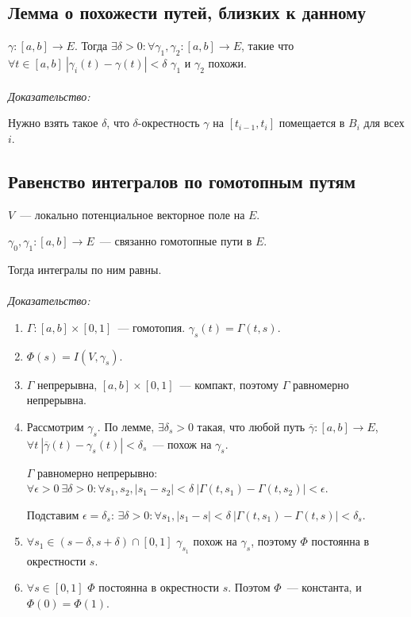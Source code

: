\documentclass[paper=a4, fontsize=11pt]{article}
\begin{document}
\subsection{Лемма о похожести путей, близких к данному}
$\gamma:[a,b] \rightarrow E$. Тогда $\exists \delta > 0: \forall \gamma_1,\gamma_2: [a,b] \rightarrow E$, такие что
$\forall t \in [a,b]\ |\gamma_i(t)-\gamma(t)|<\delta$ $\gamma_1$ и $\gamma_2$ похожи.
\\\\
\emph{Доказательство:}

Нужно взять такое $\delta$, что $\delta$-окрестность $\gamma$ на $[t_{i-1},t_i]$ помещается в $B_i$ для всех $i$.

\subsection{Равенство интегралов по гомотопным путям}
$V$~--- локально потенциальное векторное поле на $E$.

$\gamma_0,\gamma_1: [a,b] \rightarrow E$~--- связанно гомотопные пути в $E$.

Тогда интегралы по ним равны.
\\\\
\emph{Доказательство:}
\begin{enumerate}
    \item $\Gamma:[a,b]\times[0,1]$~--- гомотопия. $\gamma_s(t) = \Gamma(t,s)$.
    \item $\Phi(s) = I(V,\gamma_s)$.
    \item $\Gamma$ непрерывна, $[a,b]\times[0,1]$~--- компакт, поэтому $\Gamma$ равномерно непрерывна.
    \item Рассмотрим $\gamma_s$. По лемме, $\exists \delta_s > 0$ такая, что любой путь $\overline{\gamma}:[a,b] \rightarrow E$,
    $\forall t\ |\overline{\gamma}(t)-\gamma_s(t)| < \delta_s$~--- похож на $\gamma_s$.

    $\Gamma$ равномерно непрерывно:
    $\forall \epsilon > 0\ \exists \delta > 0: \forall s_1,s_2,|s_1-s_2|<\delta\ |\Gamma(t,s_1)-\Gamma(t,s_2)| < \epsilon$.

    Подставим $\epsilon = \delta_s$:
    $\exists \delta > 0: \forall s_1,|s_1-s|<\delta\ |\Gamma(t,s_1)-\Gamma(t,s)| < \delta_s$.
    \item $\forall s_1 \in (s-\delta,s+\delta)\cap[0,1]$ $\gamma_{s_1}$ похож на $\gamma_s$, поэтому $\Phi$ постоянна в окрестности $s$.
    \item $\forall s \in [0,1]$ $\Phi$ постоянна в окрестности $s$. Поэтом $\Phi$~--- константа, и $\Phi(0) = \Phi(1)$.
\end{enumerate}
\end{document}
